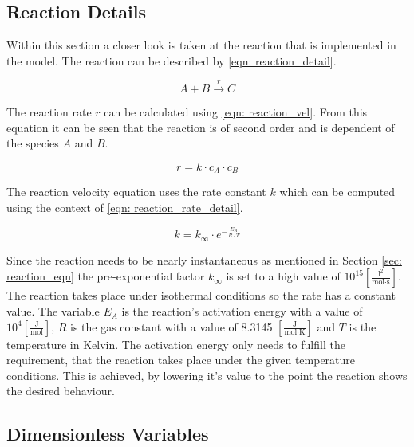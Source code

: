 \documentclass[../thesis.tex]{subfiles}
\begin{document}
\subsection{Reaction Details}
\label{sec: reaction_details}

Within this section a closer look is taken at the reaction that is implemented in the model. The reaction can be described by \autoref{eqn: reaction_detail}.

\begin{equation}
	\label{eqn: reaction_detail}
	A + B \xrightarrow{r} C
\end{equation}

The reaction rate $r$ can be calculated using \autoref{eqn: reaction_vel}. From this equation it can be seen that the reaction is of second order and is dependent of the species $A$ and $B$.

\begin{equation}
	\label{eqn: reaction_vel}
	r = k \cdot c_A \cdot c_B
\end{equation}

The reaction velocity equation uses the rate constant $k$ which can be computed using the context of \autoref{eqn: reaction_rate_detail}.

\begin{equation}
	\label{eqn: reaction_rate_detail}
	k = k_{\infty} \cdot e^{- \frac{E_A}{R \cdot T}}
\end{equation}

Since the reaction needs to be nearly instantaneous as mentioned in Section \ref{sec: reaction_eqn} the pre-exponential factor $k_{\infty}$ is set to a high value of $10^{15} \left[ \frac{\text{l}^2}{\text{mol} \cdot \text{s}} \right] $. The reaction takes place under isothermal conditions so the rate has a constant value. The variable $E_A$ is the reaction's activation energy with a value of $10^4 \left[ \frac{\text{J}}{\text{mol}} \right] $, $R$ is the gas constant with a value of 8.3145 $\left[ \frac{\text{J}}{\text{mol} \cdot \text{K}} \right] $ and $T$ is the temperature in Kelvin. The activation energy only needs to fulfill the requirement, that the reaction takes place under the given temperature conditions. This is achieved, by lowering it's value to the point the reaction shows the desired behaviour.

\subsection{Dimensionless Variables}
\end{document}

